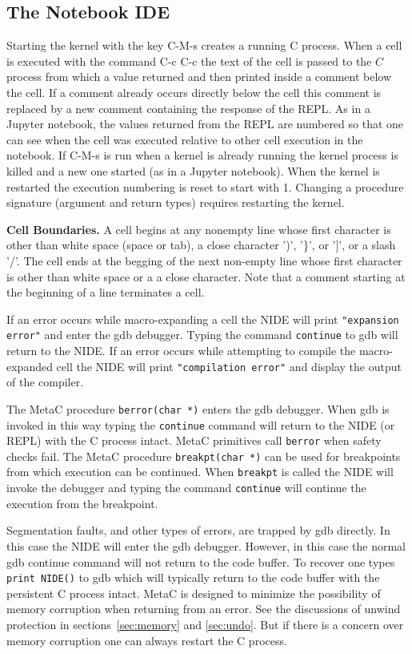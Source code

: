 \documentclass{article}
\begin{document}
\subsection{The Notebook IDE}
\label{sec:Emacs}

Starting the kernel with the key C-M-s creates a running C process.  When a cell is executed
with the command C-c C-c the text of the cell is passed to the $C$ process from which a value returned
and then printed inside a comment below the cell.  If a comment already occurs directly below the cell this
comment is replaced by a new comment containing the response of the REPL.  As in a Jupyter notebook,
the values returned from the REPL are numbered so that one can see when the cell was executed
relative to other cell execution in the notebook.  If C-M-s is run when a kernel is already running
the kernel process is killed and a new one started (as in a Jupyter notebook).  When the kernel is
restarted the execution numbering is reset to start with 1.  Changing a procedure signature
(argument and return types) requires restarting the kernel.

{\bf Cell Boundaries.}
A cell begins at any nonempty line whose first character is other than white space (space or tab), a close character ')', '\}', or ']', or a slash '/'.
The cell ends at the begging of the next non-empty line whose first character is other than white space or a a close character.  Note that a comment
starting at the beginning of a line terminates a cell.

If an error occurs while macro-expanding a cell the NIDE will print {\tt "expansion error"} and enter the gdb debugger.  Typing the command {\tt continue}
to gdb will return to the NIDE.
If an error occurs while attempting to compile the macro-expanded cell the NIDE will print {\tt "compilation error"} and display the output of the compiler.

The MetaC procedure {\tt berror(char *)} enters the gdb debugger. When gdb is invoked in this way typing the {\tt continue} command
will return to the NIDE (or REPL) with the C process intact. MetaC primitives call {\tt berror} when safety checks fail.
The MetaC procedure {\tt breakpt(char *)} can be used for breakpoints from which execution can be continued.  When {\tt breakpt} is called
the NIDE will invoke the debugger and typing the command {\tt continue} will continue the execution from the breakpoint.

Segmentation faults, and other types of errors, are trapped by gdb directly.  In this case the
NIDE will enter the gdb debugger.  However, in this case the normal gdb continue command will not return to the code buffer.
To recover one types {\tt print NIDE()} to gdb which will typically
return to the code buffer with the persistent C process intact.  MetaC is designed to minimize the possibility of memory corruption
when returning from an error.  See the discussions of unwind protection in sections~\ref{sec:memory} and \ref{sec:undo}.
But if there is a concern over memory corruption one can always restart the C process.
\end{document}
